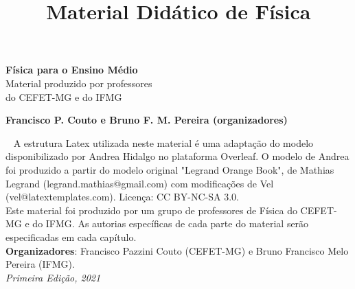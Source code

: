 \documentclass[11pt,fleqn]{book} %
\begin{document}
\title{Material Didático de Física}


\begingroup
\thispagestyle{empty}
\centering
\vspace*{5cm}
\par\normalfont\fontsize{30}{30}\sffamily\selectfont
\textbf{Física para o Ensino Médio}\\ \vspace*{1.0cm} 
{\LARGE Material produzido por professores \\ do CEFET-MG e do IFMG}\par %
\vspace*{0.4cm}
{\small \textbf{Francisco P. Couto e Bruno F. M. Pereira (organizadores)}}\par %
\endgroup

\newpage
~\vfill
\thispagestyle{empty}
A estrutura Latex utilizada neste material é uma adaptação do modelo disponibilizado por Andrea Hidalgo no plataforma Overleaf. O modelo de Andrea foi produzido a partir do modelo original "Legrand Orange Book", de  Mathias Legrand (legrand.mathias@gmail.com) com modificações de Vel (vel@latextemplates.com). Licença: CC BY-NC-SA 3.0. \\


\noindent Este material foi produzido por um grupo de professores de Física do CEFET-MG e do IFMG. As autorias específicas de cada parte do material serão especificadas em cada capítulo. \\ 

\noindent \textbf{Organizadores}: Francisco Pazzini Couto (CEFET-MG) e Bruno Francisco Melo Pereira (IFMG). \\ 


\noindent \textit{Primeira Edição, 2021} 

\end{document}
